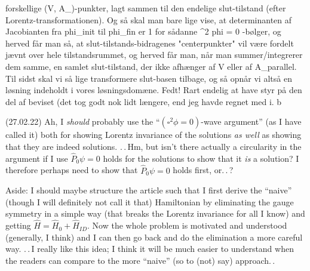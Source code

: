\documentclass{report}
\begin{document}
forskellige (V, A_\parallel)-punkter, lagt sammen til den endelige slut-tilstand (efter Lorentz-transformationen). Og så skal man bare lige vise, at determinanten af Jacobianten fra phi_{init} til phi_{fin} er 1 for sådanne \square^2 phi = 0 -bølger, og herved får man så, at slut-tilstands-bidragenes "centerpunkter" vil være fordelt jævnt over hele tilstandsrummet, og herved får man, når man summer/integrerer dem samme, en samlet slut-tilstand, der ikke afhænger af V eller af A_parallel. Til sidst skal vi så lige transformere slut-basen tilbage, og så opnår vi altså en løsning indeholdt i vores løsningsdomæne. Fedt! Rart endelig at have styr på den del af beviset (det tog godt nok lidt længere, end jeg havde regnet med ^^). ^^" 
%


(27.02.22) Ah, I \emph{should} probably use the ``$(\square^2\phi = 0)$-wave argument'' (as I have called it) both for showing Lorentz invariance of the solutions \emph{as well} as showing that they are indeed solutions. .\,.\,Hm, but isn't there actually a circularity in the argument if I use $\hat P_0 \psi = 0$ holds for the solutions to show that it \emph{is} a solution? I therefore perhaps need to show that $\hat P_0 \psi = 0$ holds first, or.\,.\,? 

Aside: I should maybe structure the article such that I first derive the ``naive'' (though I will definitely not call it that) Hamiltonian by eliminating the gauge symmetry in a simple way (that breaks the Lorentz invariance for all I know) and getting $\hat H = \hat H_0 + \hat H_{I D}$. Now the whole problem is motivated and understood (generally, I think) and I can then go back and do the elimination a more careful way. .\,.\,I really like this idea; I think it will be much easier to understand when the readers can compare to the more ``naive'' (so to (not) say) approach.\,. 
\end{document}
